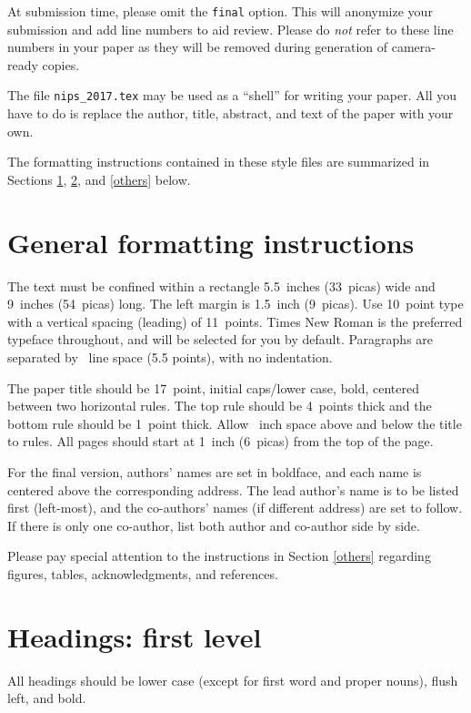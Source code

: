 \documentclass{article}
\begin{document}
At submission time, please omit the \verb+final+ option. This will
anonymize your submission and add line numbers to aid review.  Please
do \emph{not} refer to these line numbers in your paper as they will
be removed during generation of camera-ready copies.

The file \verb+nips_2017.tex+ may be used as a ``shell'' for writing
your paper. All you have to do is replace the author, title, abstract,
and text of the paper with your own.

The formatting instructions contained in these style files are
summarized in Sections \ref{gen_inst}, \ref{headings}, and
\ref{others} below.

\section{General formatting instructions}
\label{gen_inst}

The text must be confined within a rectangle 5.5~inches (33~picas)
wide and 9~inches (54~picas) long. The left margin is 1.5~inch
(9~picas).  Use 10~point type with a vertical spacing (leading) of
11~points.  Times New Roman is the preferred typeface throughout, and
will be selected for you by default.  Paragraphs are separated by
~line space (5.5 points), with no indentation.

The paper title should be 17~point, initial caps/lower case, bold,
centered between two horizontal rules. The top rule should be 4~points
thick and the bottom rule should be 1~point thick. Allow
~inch space above and below the title to rules. All
pages should start at 1~inch (6~picas) from the top of the page.

For the final version, authors' names are set in boldface, and each
name is centered above the corresponding address. The lead author's
name is to be listed first (left-most), and the co-authors' names (if
different address) are set to follow. If there is only one co-author,
list both author and co-author side by side.

Please pay special attention to the instructions in Section \ref{others}
regarding figures, tables, acknowledgments, and references.

\section{Headings: first level}
\label{headings}

All headings should be lower case (except for first word and proper
nouns), flush left, and bold.
\end{document}
